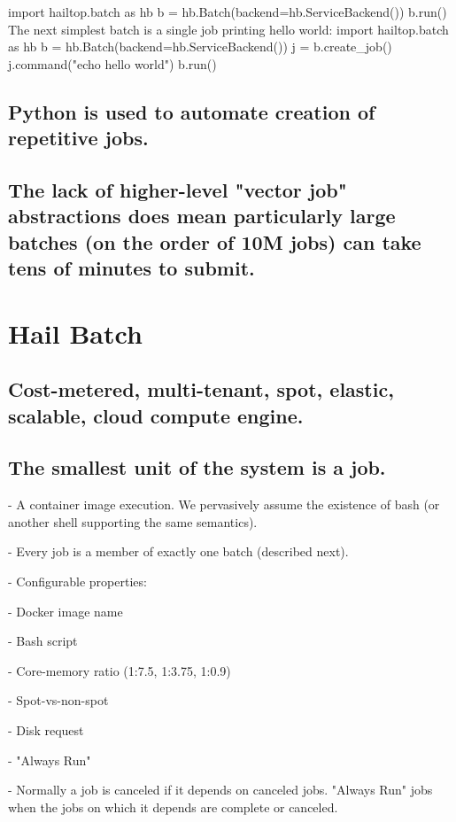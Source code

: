 \documentclass[sigconf, nonacm]{acmart}
\begin{document}
    import hailtop.batch as hb
    b = hb.Batch(backend=hb.ServiceBackend())
    b.run()
    The next simplest batch is a single job printing hello world:
    import hailtop.batch as hb
    b = hb.Batch(backend=hb.ServiceBackend())
    j = b.create\_job()
    j.command("echo hello world")
    b.run()

\subsection{Python is used to automate creation of repetitive jobs.}

\subsection{The lack of higher-level "vector job" abstractions does mean particularly large batches (on the order of 10M jobs) can take tens of minutes to submit.}

\section{Hail Batch}

\subsection{Cost-metered, multi-tenant, spot, elastic, scalable, cloud compute engine.}

\subsection{The smallest unit of the system is a job.}

    - A container image execution. We pervasively assume the existence of bash (or another shell supporting the same semantics).

    - Every job is a member of exactly one batch (described next).

    - Configurable properties:

      - Docker image name

      - Bash script

      - Core-memory ratio (1:7.5, 1:3.75, 1:0.9)

      - Spot-vs-non-spot

      - Disk request

      - "Always Run"

        - Normally a job is canceled if it depends on canceled jobs. "Always Run" jobs when the jobs on which it depends are complete or canceled.
\end{document}
